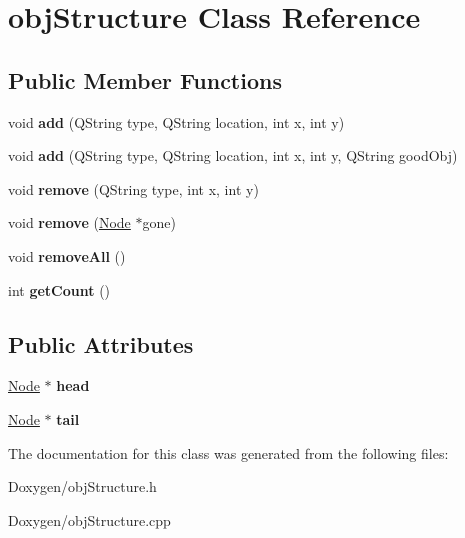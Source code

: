 \hypertarget{classobj_structure}{\section{obj\-Structure Class Reference}
\label{classobj_structure}
}
\subsection*{Public Member Functions}
\begin{DoxyCompactItemize}
\item 
\hypertarget{classobj_structure_a471be95d137c9d40b45e49be917f3933}{void {\bfseries add} (Q\-String type, Q\-String location, int x, int y)}\label{classobj_structure_a471be95d137c9d40b45e49be917f3933}

\item 
\hypertarget{classobj_structure_a4bfcab0d9931a486b303a8be4d7f380a}{void {\bfseries add} (Q\-String type, Q\-String location, int x, int y, Q\-String good\-Obj)}\label{classobj_structure_a4bfcab0d9931a486b303a8be4d7f380a}

\item 
\hypertarget{classobj_structure_ad8ee59f0e4377ee81469edca96b6a623}{void {\bfseries remove} (Q\-String type, int x, int y)}\label{classobj_structure_ad8ee59f0e4377ee81469edca96b6a623}

\item 
\hypertarget{classobj_structure_a6efb04e79b755dffa27d22a48e51140d}{void {\bfseries remove} (\hyperlink{class_node}{Node} $\ast$gone)}\label{classobj_structure_a6efb04e79b755dffa27d22a48e51140d}

\item 
\hypertarget{classobj_structure_a41750e7cf482a5831d63b4bc0e494101}{void {\bfseries remove\-All} ()}\label{classobj_structure_a41750e7cf482a5831d63b4bc0e494101}

\item 
\hypertarget{classobj_structure_aa7c8aff07ac4acf636029ea3fd9a427b}{int {\bfseries get\-Count} ()}\label{classobj_structure_aa7c8aff07ac4acf636029ea3fd9a427b}

\end{DoxyCompactItemize}
\subsection*{Public Attributes}
\begin{DoxyCompactItemize}
\item 
\hypertarget{classobj_structure_aa7c0d7034f8597701ea1317bd6e144b1}{\hyperlink{class_node}{Node} $\ast$ {\bfseries head}}\label{classobj_structure_aa7c0d7034f8597701ea1317bd6e144b1}

\item 
\hypertarget{classobj_structure_ad49ade870fa2a6c48a1f875e9ecbb63b}{\hyperlink{class_node}{Node} $\ast$ {\bfseries tail}}\label{classobj_structure_ad49ade870fa2a6c48a1f875e9ecbb63b}

\end{DoxyCompactItemize}


The documentation for this class was generated from the following files\-:\begin{DoxyCompactItemize}
\item 
Doxygen/obj\-Structure.\-h\item 
Doxygen/obj\-Structure.\-cpp\end{DoxyCompactItemize}
